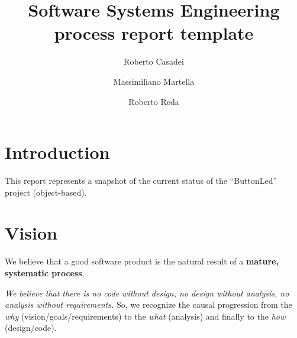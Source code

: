 \documentclass{article}
\newcommand{\labelsec}[1]{\label{sec:#1}}
\newcommand{\xauthA}{Roberto Casadei }
\newcommand{\xauthB}{Massimiliano Martella}
\newcommand{\xauthC}{Roberto Reda}
\newcommand{\xunibo}{Alma Mater Studiorum -- University of Bologna}
\newcommand{\xaddrCE}{via Venezia 52}
\newcommand{\xcityCE}{47023 Cesena, Italy}
\begin{document}
\title{Software Systems Engineering\\
 process report template}

\author{\xauthA \and \xauthB \and \xauthC}



\maketitle



\section{Introduction}
\labelsec{intro}

 This report represents a snapshot of the current status 
  of the ``ButtonLed'' project (object-based).

\section{Vision}
\labelsec{Vision}

We believe that a good software product is the natural result of a
\textbf{mature, systematic process}.

\emph{We believe that there is no code without design, no design without
analysis, no analysis without requirements.} So, we recognize the causal
progression from the \emph{why} (vision/goals/requirements) to the \emph{what}
(analysis) and finally to the \emph{how} (design/code).
\end{document}
